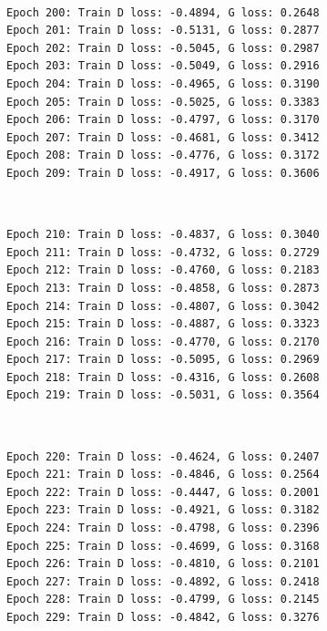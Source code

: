 \documentclass[11pt]{article}
\begin{document}
    \begin{center}
    \end{center}
    { \hspace*{\fill} \\}
    
    \begin{Verbatim}[commandchars=\\\{\}]
Epoch 200: Train D loss: -0.4894, G loss: 0.2648
Epoch 201: Train D loss: -0.5131, G loss: 0.2877
Epoch 202: Train D loss: -0.5045, G loss: 0.2987
Epoch 203: Train D loss: -0.5049, G loss: 0.2916
Epoch 204: Train D loss: -0.4965, G loss: 0.3190
Epoch 205: Train D loss: -0.5025, G loss: 0.3383
Epoch 206: Train D loss: -0.4797, G loss: 0.3170
Epoch 207: Train D loss: -0.4681, G loss: 0.3412
Epoch 208: Train D loss: -0.4776, G loss: 0.3172
Epoch 209: Train D loss: -0.4917, G loss: 0.3606

    \end{Verbatim}

    \begin{center}
    \end{center}
    { \hspace*{\fill} \\}
    
    \begin{Verbatim}[commandchars=\\\{\}]
Epoch 210: Train D loss: -0.4837, G loss: 0.3040
Epoch 211: Train D loss: -0.4732, G loss: 0.2729
Epoch 212: Train D loss: -0.4760, G loss: 0.2183
Epoch 213: Train D loss: -0.4858, G loss: 0.2873
Epoch 214: Train D loss: -0.4807, G loss: 0.3042
Epoch 215: Train D loss: -0.4887, G loss: 0.3323
Epoch 216: Train D loss: -0.4770, G loss: 0.2170
Epoch 217: Train D loss: -0.5095, G loss: 0.2969
Epoch 218: Train D loss: -0.4316, G loss: 0.2608
Epoch 219: Train D loss: -0.5031, G loss: 0.3564

    \end{Verbatim}

    \begin{center}
    \end{center}
    { \hspace*{\fill} \\}
    
    \begin{Verbatim}[commandchars=\\\{\}]
Epoch 220: Train D loss: -0.4624, G loss: 0.2407
Epoch 221: Train D loss: -0.4846, G loss: 0.2564
Epoch 222: Train D loss: -0.4447, G loss: 0.2001
Epoch 223: Train D loss: -0.4921, G loss: 0.3182
Epoch 224: Train D loss: -0.4798, G loss: 0.2396
Epoch 225: Train D loss: -0.4699, G loss: 0.3168
Epoch 226: Train D loss: -0.4810, G loss: 0.2101
Epoch 227: Train D loss: -0.4892, G loss: 0.2418
Epoch 228: Train D loss: -0.4799, G loss: 0.2145
Epoch 229: Train D loss: -0.4842, G loss: 0.3276

    \end{Verbatim}
\end{document}
